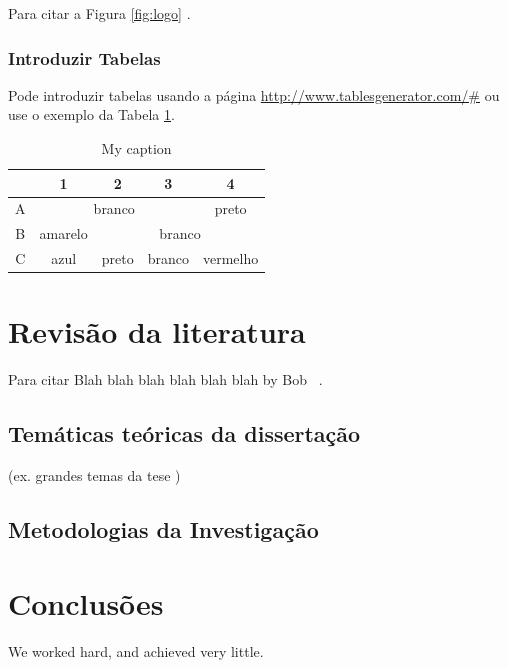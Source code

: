 \documentclass[12pt,a4paper, oneside]{article}
\begin{document}
Para citar a Figura \ref{fig:logo} .

\subsubsection{Introduzir Tabelas}

Pode introduzir tabelas usando a página \url{http://www.tablesgenerator.com/#} ou use o exemplo da Tabela \ref{my-label}.

\begin{table}[]
\centering
\caption{My caption}
\label{my-label}
\begin{tabular}{c|cccc}
  & \textbf{1} & \textbf{2} & \textbf{3} & \textbf{4} \\ \hline
A & \multicolumn{3}{c}{branco}           & preto      \\
B & amarelo    & \multicolumn{3}{c}{branco}           \\
C & azul       & preto      & branco     & vermelho   \\ \hline
\end{tabular}
\end{table}

\section{Revisão da literatura}\label{sec:rev}
Para citar Blah blah blah blah blah blah by Bob ~\cite{BobsBook01}.

\subsection{Temáticas teóricas da dissertação} \label{subsec:con}

(ex. grandes temas da tese )

\subsection{Metodologias da Investigação}\label{sec:met}



\section{Conclusões}\label{sec:con}
We worked hard, and achieved very little.

{}
\end{document}
